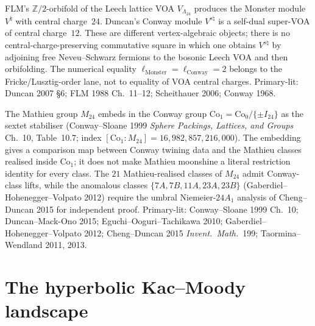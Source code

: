 \begin{remark}
\label{rem:latfnd-w19-witten-monster-conway-diamond}
FLM's $\mathbb{Z}/2$-orbifold of the Leech lattice VOA
$V_{\Lambda_{24}}$ produces the Monster module $V^\natural$ with
central charge~$24$. Duncan's Conway module $V^{s\natural}$ is a
self-dual super-VOA of central charge~$12$. These are different
vertex-algebraic objects; there is no central-charge-preserving
commutative square in which one obtains $V^{s\natural}$ by adjoining
free Neveu--Schwarz fermions to the bosonic Leech VOA and then
orbifolding. The numerical equality
$\ell_{\mathrm{Monster}}=\ell_{\mathrm{Conway}}=2$ belongs to the
Fricke/Lusztig-order lane, not to equality of VOA central charges.
Primary-lit: Duncan 2007 \S6; FLM 1988 Ch.~11--12;
Scheithauer 2006; Conway 1968.
\end{remark}

\begin{remark}
\label{rem:latfnd-w19-witten-M24-in-Co1}
The Mathieu group $M_{24}$ embeds in the Conway group
$\mathrm{Co}_1 = \mathrm{Co}_0/\{\pm I_{24}\}$ as the sextet
stabiliser (Conway--Sloane 1999 \emph{Sphere Packings, Lattices,
and Groups} Ch.~10, Table~10.7; index $[\mathrm{Co}_1:M_{24}] =
16{,}982{,}857{,}216{,}000$). The embedding gives a comparison map
between Conway twining data and the Mathieu classes realised inside
$\mathrm{Co}_1$; it does not make Mathieu moonshine a literal
restriction identity for every class. The $21$ Mathieu-realised
classes of $M_{24}$ admit Conway-class lifts, while the anomalous classes
$\{7A, 7B, 11A, 23A, 23B\}$ (Gaberdiel--Hohenegger--Volpato 2012)
require the umbral Niemeier-$24A_1$ analysis of Cheng--Duncan 2015
for independent proof.
Primary-lit: Conway--Sloane 1999 Ch.~10;
Duncan--Mack-Ono 2015;
Eguchi--Ooguri--Tachikawa 2010;
Gaberdiel--Hohenegger--Volpato 2012;
Cheng--Duncan 2015 \emph{Invent.\ Math.}~199;
Taormina--Wendland 2011, 2013.
\end{remark}

\section{The hyperbolic Kac--Moody landscape}
\label{sec:latfnd-w19-drinfeld-hyperbolic-km-landscape}

